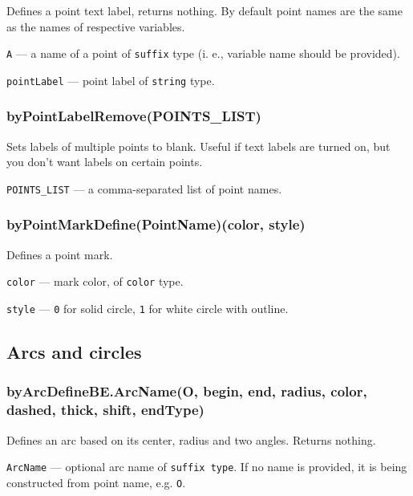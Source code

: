 \documentclass{ltxdoc}
\begin{document}
	Defines a point text label, returns nothing. By default point names are the same as the names of respective variables.
	
	\texttt{A} — a name of a point of \texttt{suffix} type  (i. e., variable name should be provided).
	
	\texttt{pointLabel} — point label of \texttt{string} type.

\subsubsection{byPointLabelRemove(POINTS\_LIST)}\label{byPointLabelRemove}

	Sets labels of multiple points to blank. Useful if text labels are turned on, but you don't want labels on certain points.

	\texttt{POINTS\_LIST} — a comma-separated list of point names.

\subsubsection{byPointMarkDefine(PointName)(color, style)}\label{byPointMarkDefine}

	Defines a point mark.

	\texttt{color} — mark color, of \texttt{color} type.

	\texttt{style} — \texttt{0} for solid circle, \texttt{1} for white circle with outline.
		

\subsection{Arcs and circles}


\subsubsection{byArcDefineBE.ArcName(O, begin, end, radius, color, dashed, thick, shift, endType)}\label{byArcDefineBE}

Defines an arc based on its center, radius and two angles. Returns nothing.

\texttt{ArcName} — optional arc name of \texttt{suffix type}. If no name is provided, it is being constructed from point name, e.g. \texttt{O}.
\end{document}
